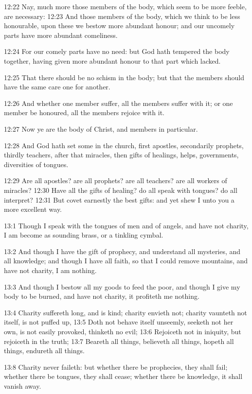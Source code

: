12:22 Nay, much more those members of the body, which seem to be more
feeble, are necessary: 12:23 And those members of the body, which we
think to be less honourable, upon these we bestow more abundant
honour; and our uncomely parts have more abundant comeliness.

12:24 For our comely parts have no need: but God hath tempered the
body together, having given more abundant honour to that part which
lacked.

12:25 That there should be no schism in the body; but that the members
should have the same care one for another.

12:26 And whether one member suffer, all the members suffer with it;
or one member be honoured, all the members rejoice with it.

12:27 Now ye are the body of Christ, and members in particular.

12:28 And God hath set some in the church, first apostles, secondarily
prophets, thirdly teachers, after that miracles, then gifts of
healings, helps, governments, diversities of tongues.

12:29 Are all apostles? are all prophets? are all teachers? are all
workers of miracles?  12:30 Have all the gifts of healing? do all
speak with tongues? do all interpret?  12:31 But covet earnestly the
best gifts: and yet shew I unto you a more excellent way.

13:1 Though I speak with the tongues of men and of angels, and have
not charity, I am become as sounding brass, or a tinkling cymbal.

13:2 And though I have the gift of prophecy, and understand all
mysteries, and all knowledge; and though I have all faith, so that I
could remove mountains, and have not charity, I am nothing.

13:3 And though I bestow all my goods to feed the poor, and though I
give my body to be burned, and have not charity, it profiteth me
nothing.

13:4 Charity suffereth long, and is kind; charity envieth not; charity
vaunteth not itself, is not puffed up, 13:5 Doth not behave itself
unseemly, seeketh not her own, is not easily provoked, thinketh no
evil; 13:6 Rejoiceth not in iniquity, but rejoiceth in the truth; 13:7
Beareth all things, believeth all things, hopeth all things, endureth
all things.

13:8 Charity never faileth: but whether there be prophecies, they
shall fail; whether there be tongues, they shall cease; whether there
be knowledge, it shall vanish away.

